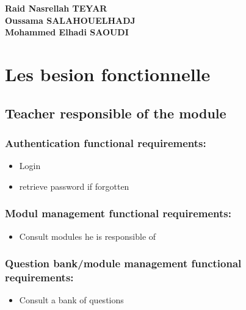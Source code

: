\documentclass[a4paper,12p]{article}
\begin{document}


     \begin{center}
        \textbf{Raid Nasrellah TEYAR} \\
        \textbf{Oussama SALAHOUELHADJ} \\
        \textbf{Mohammed Elhadi SAOUDI} \\
    \end{center}

     \raggedright\section{Les besion fonctionnelle}

    
     \subsection{Teacher responsible of the module}
        \subsubsection{Authentication functional requirements:}
        \begin{itemize}
            \item Login
            \item retrieve password if forgotten
        \end{itemize}

        \subsubsection{Modul management functional requirements:}
        \begin{itemize}
            \item Consult modules he is responsible of
        \end{itemize}

        \subsubsection{Question bank/module management functional requirements:}
        \begin{itemize}
            \item Consult a bank of questions
        \end{itemize}
\end{document}
